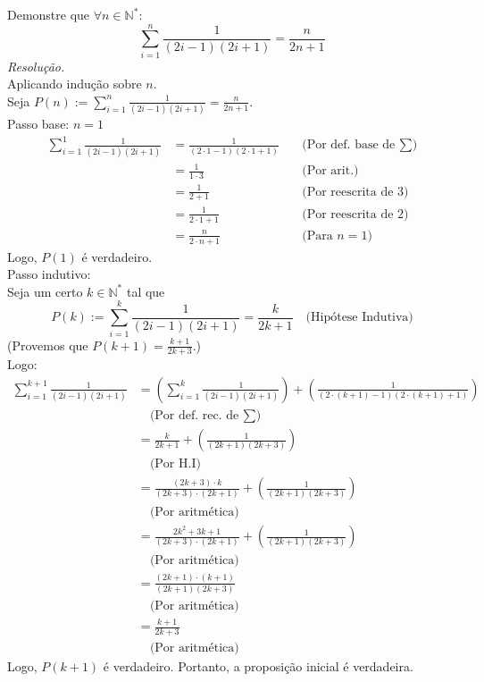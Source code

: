 Demonstre que $\forall n \in \mathbb{N}^*$:
\begin{displaymath}
	\sum\limits_{i=1}^n \frac{1}{(2i - 1) (2i + 1)} = \frac{n}{2n + 1}
\end{displaymath}
\emph{Resolução.} \\
Aplicando indução sobre $n$. \\
Seja $P(n) := \sum\limits_{i=1}^n \frac{1}{(2i - 1) (2i + 1)} = \frac{n}{2n + 1}$. \\
Passo base: $n = 1$
\begin{align*}
	\sum\limits_{i=1}^1 \frac{1}{(2i - 1) (2i + 1)}
	 & = \frac{1}{(2\cdot1 - 1) (2\cdot1 + 1)} & \quad \text{(Por def. base de $\sum$)} \\
	 & = \frac{1}{1 \cdot 3}                   & \quad \text{(Por arit.)}               \\
	 & = \frac{1}{2 + 1}                       & \quad \text{(Por reescrita de 3)}      \\
	 & = \frac{1}{2 \cdot 1 + 1}               & \quad \text{(Por reescrita de 2)}      \\
	 & = \frac{n}{2 \cdot n + 1}               & \quad \text{(Para $n = 1$)}
\end{align*}
Logo, $P(1)$ é verdadeiro. \\
Passo indutivo: \\
Seja um certo $k \in \mathbb{N}^*$ tal que
\begin{displaymath}
	P(k) := \sum\limits_{i = 1}^k \frac{1}{(2i - 1) (2i + 1)} = \frac{k}{2k + 1} \quad \text{(Hipótese Indutiva)}
\end{displaymath}
(Provemos que $P(k + 1) = \frac{k + 1}{2k + 3}$.) \\
Logo:
\begin{align*}
	\sum\limits_{i=1}^{k + 1} \frac{1}{(2i - 1) (2i + 1)}
	 & =	(\sum\limits_{i=1}^{k} \frac{1}{(2i - 1) (2i + 1)}) + (\frac{1}{(2 \cdot (k + 1) - 1) (2 \cdot (k + 1) + 1)}) \\ & \quad \text{(Por def. rec. de $\sum$)}\\
	 & =	\frac{k}{2k + 1} + (\frac{1}{(2k + 1) (2k + 3)})                                                              \\ & \quad \text{(Por H.I)} \\
	 & =	\frac{(2k + 3) \cdot k}{(2k + 3) \cdot (2k + 1)} + (\frac{1}{(2k + 1) (2k + 3)})                              \\ & \quad \text{(Por aritmética)} \\
	 & =	\frac{2k^2 + 3k + 1}{(2k + 3) \cdot (2k + 1)} + (\frac{1}{(2k + 1) (2k + 3)})                                 \\ & \quad \text{(Por aritmética)}                                \\
	 & = 	\frac{(2k + 1) \cdot (k + 1)}{(2k + 1) (2k + 3)}                                                             \\ & \quad \text{(Por aritmética)} \\
	 & = 	\frac{k + 1}{2k + 3}                                                                                         \\ & \quad \text{(Por aritmética)}
\end{align*}
Logo, $P(k + 1)$ é verdadeiro.
Portanto, a proposição inicial é verdadeira.
